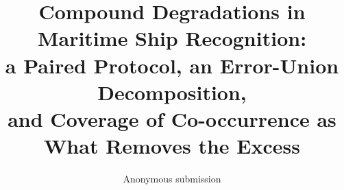 \documentclass[10pt,twocolumn,letterpaper]{article}
\title{Compound Degradations in Maritime Ship Recognition:\\ a Paired Protocol, an Error-Union Decomposition,\\ and Coverage of Co-occurrence as What Removes the Excess}
\author{Anonymous submission}
\affiliation{}
\begin{document}
\maketitle

{\small


}
\end{document}
